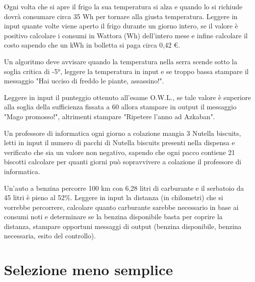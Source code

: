 \begin{exercise}
	Ogni volta che si apre il frigo la sua temperatura si alza e quando lo si richiude dovrà consumare circa 35 Wh per tornare alla giusta temperatura. Leggere in input quante volte viene aperto il frigo durante un giorno intero, se il valore è positivo calcolare i consumi in Wattora (Wh) dell'intero mese e infine calcolare il costo sapendo che un kWh in bolletta si paga circa 0,42 €.
\end{exercise}

\begin{exercise}
	Un algoritmo deve avvisare quando la temperatura nella serra scende sotto la soglia critica di -5°, leggere la temperatura in input e se troppo bassa stampare il messaggio "Hai ucciso di freddo le piante, assassino!".
\end{exercise}

\begin{exercise}
	Leggere in input il punteggio ottenuto all'esame O.W.L., se tale valore è superiore alla soglia della sufficienza fissata a 60 allora stampare in output il messaggio "Mago promosso!", altrimenti stampare "Ripetere l'anno ad Azkaban".
\end{exercise}

\begin{exercise}
	Un professore di informatica ogni giorno a colazione mangia 3 Nutella biscuits, letti in input il numero di pacchi di Nutella biscuits presenti nella dispensa e verificato che sia un valore non negativo, sapendo che ogni pacco contiene 21 biscotti calcolare per quanti giorni può sopravvivere a colazione il professore di informatica.
\end{exercise}

\begin{exercise}
	Un'auto a benzina percorre 100 km con 6,28 litri di carburante e il serbatoio da 45 litri è pieno al 52\%. Leggere in input la distanza (in chilometri) che si vorrebbe percorrere, calcolare quanto carburante sarebbe necessario in base ai consumi noti e determinare se la benzina disponibile basta per coprire la distanza, stampare opportuni messaggi di output (benzina disponibile, benzina necessaria, esito del controllo).
\end{exercise}

\section{Selezione meno semplice}

